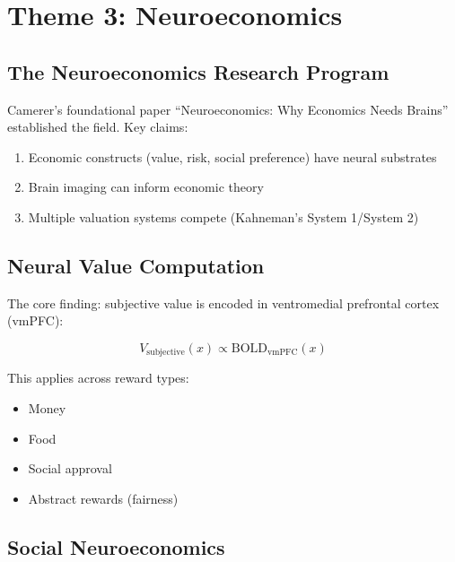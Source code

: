\section{Theme 3: Neuroeconomics}
\label{sec:ca-neuro}

\subsection{The Neuroeconomics Research Program}

Camerer's foundational paper ``Neuroeconomics: Why Economics Needs Brains'' \citep{PAP-PAP-camerer2004neuroeconomicsneuroeconomics} established the field. Key claims:

\begin{enumerate}[nosep]
\item Economic constructs (value, risk, social preference) have neural substrates
\item Brain imaging can inform economic theory
\item Multiple valuation systems compete (Kahneman's System 1/System 2)
\end{enumerate}

\subsection{Neural Value Computation}

The core finding: subjective value is encoded in ventromedial prefrontal cortex (vmPFC):

\begin{equation}
V_{\text{subjective}}(x) \propto \text{BOLD}_{\text{vmPFC}}(x)
\end{equation}

This applies across reward types:
\begin{itemize}[nosep]
\item Money
\item Food
\item Social approval
\item Abstract rewards (fairness)
\end{itemize}

\subsection{Social Neuroeconomics}

